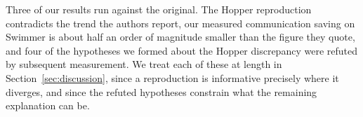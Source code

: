 Three of our results run against the original. The Hopper reproduction
contradicts the trend the authors report, our measured communication saving on
Swimmer is about half an order of magnitude smaller than the figure they quote,
and four of the hypotheses we formed about the Hopper discrepancy were refuted
by subsequent measurement. We treat each of these at length in
Section~\ref{sec:discussion}, since a reproduction is informative precisely
where it diverges, and since the refuted hypotheses constrain what the
remaining explanation can be.
